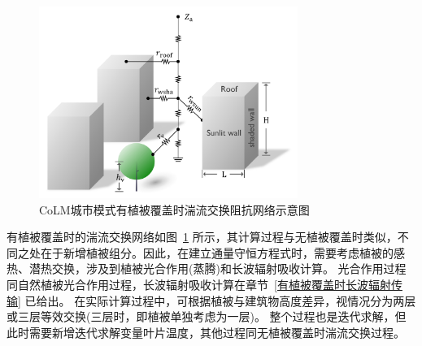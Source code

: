 {
  \begin{figure}[htbp]
    \centering
    \includegraphics[width=0.75\textwidth]{Figures/城市模式/CoLM城市模式包含植被湍流交换阻抗网络_v2.png}
    \caption{CoLM城市模式有植被覆盖时湍流交换阻抗网络示意图}
    \label{fig:有植被覆盖时城市湍流交换阻抗示意图}
  \end{figure}
}
有植被覆盖时的湍流交换网络如图~\ref{fig:有植被覆盖时城市湍流交换阻抗示意图} 所示，其计算过程与无植被覆盖时类似，不同之处在于新增植被组分。因此，在建立通量守恒方程式时，需要考虑植被的感热、潜热交换，涉及到植被光合作用(蒸腾)和长波辐射吸收计算。
光合作用过程同自然植被光合作用过程，长波辐射吸收计算在章节~\ref{有植被覆盖时长波辐射传输} 已给出。
在实际计算过程中，可根据植被与建筑物高度差异，视情况分为两层或三层等效交换(三层时，即植被单独考虑为一层)。
整个过程也是迭代求解，但此时需要新增迭代求解变量叶片温度，其他过程同无植被覆盖时湍流交换过程。

